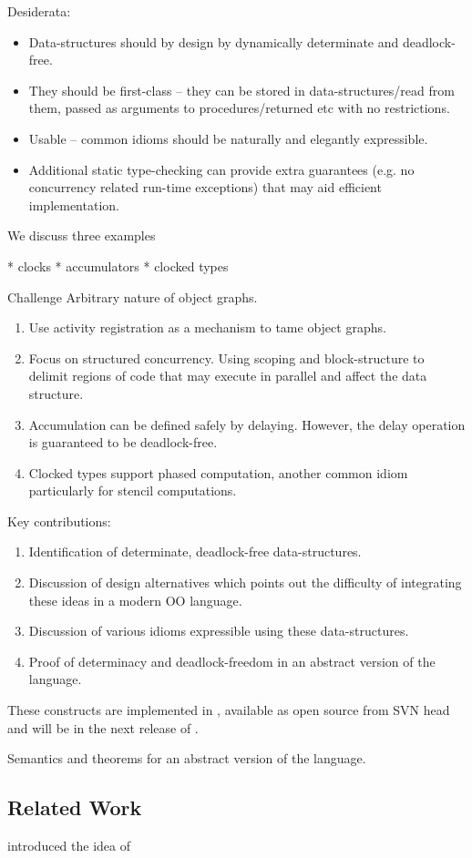 
Desiderata:

\begin{itemize}
\item Data-structures should by design by dynamically determinate and
   deadlock-free.
\item They should be first-class -- they can be stored in
  data-structures/read from them, passed as arguments to
  procedures/returned etc with no restrictions. 
\item Usable -- common idioms should be naturally and elegantly expressible.
\item Additional static type-checking can provide extra guarantees
  (e.g.{} no concurrency related run-time exceptions) that may aid
  efficient implementation.
\end{itemize}

We discuss three examples

  * clocks
  * accumulators
  * clocked types

Challenge
  Arbitrary nature of object graphs.


{\em 
\begin{enumerate}
\item Use activity registration as a mechanism to tame object graphs.
\item Focus on structured concurrency. Using scoping and block-structure
    to delimit regions of code that may execute in parallel and affect
    the data structure.

\item Accumulation can be defined safely by delaying. However, the delay
    operation is guaranteed to be deadlock-free.

\item Clocked types support phased computation, another common idiom
    particularly for stencil computations.
\end{enumerate}
}

Key contributions:
{\em 
\begin{enumerate}
\item Identification of determinate, deadlock-free data-structures. 
\item Discussion of design alternatives which points out the
  difficulty of integrating these ideas in a modern OO language.
\item Discussion of various idioms expressible using these data-structures.
\item Proof of determinacy and deadlock-freedom in an abstract version
  of the language.
\end{enumerate}
These constructs are implemented in \Xten, available as open source from
SVN head and will be in the next release of \Xten.
}


Semantics and theorems for an abstract version of the language.


\subsection{Related Work}

\cite{Steele:1989:MAP:96709.96731} introduced the idea of 
